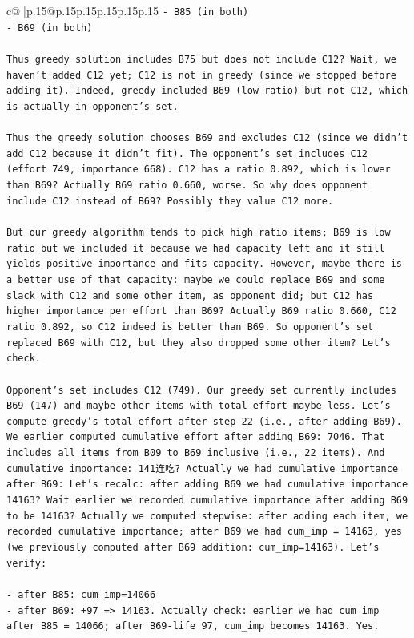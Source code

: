 \documentclass{article}
\begin{document}
{\begin{supertabular}{c@{$\;$}|p{.15\linewidth}@{}p{.15\linewidth}p{.15\linewidth}p{.15\linewidth}p{.15\linewidth}p{.15\linewidth}}
{{{\texttt{{-} B85 (in both)} \\
\texttt{{-} B69 (in both)} \\
\\ 
\texttt{Thus greedy solution includes B75 but does not include C12? Wait, we haven't added C12 yet; C12 is not in greedy (since we stopped before adding it). Indeed, greedy included B69 (low ratio) but not C12, which is actually in opponent's set.} \\
\\ 
\texttt{Thus the greedy solution chooses B69 and excludes C12 (since we didn't add C12 because it didn't fit). The opponent's set includes C12 (effort 749, importance 668). C12 has a ratio 0.892, which is lower than B69? Actually B69 ratio 0.660, worse. So why does opponent include C12 instead of B69? Possibly they value C12 more.} \\
\\ 
\texttt{But our greedy algorithm tends to pick high ratio items; B69 is low ratio but we included it because we had capacity left and it still yields positive importance and fits capacity. However, maybe there is a better use of that capacity: maybe we could replace B69 and some slack with C12 and some other item, as opponent did; but C12 has higher importance per effort than B69? Actually B69 ratio 0.660, C12 ratio 0.892, so C12 indeed is better than B69. So opponent's set replaced B69 with C12, but they also dropped some other item? Let's check.} \\
\\ 
\texttt{Opponent's set includes C12 (749). Our greedy set currently includes B69 (147) and maybe other items with total effort maybe less. Let's compute greedy's total effort after step 22 (i.e., after adding B69). We earlier computed cumulative effort after adding B69: 7046. That includes all items from B09 to B69 inclusive (i.e., 22 items). And cumulative importance: 141连吃? Actually we had cumulative importance after B69: Let's recalc: after adding B69 we had cumulative importance 14163? Wait earlier we recorded cumulative importance after adding B69 to be 14163? Actually we computed stepwise: after adding each item, we recorded cumulative importance; after B69 we had cum\_imp = 14163, yes (we previously computed after B69 addition: cum\_imp=14163). Let's verify:} \\
\\ 
\texttt{{-} after B85: cum\_imp=14066} \\
\texttt{{-} after B69: +97 => 14163. Actually check: earlier we had cum\_imp after B85 = 14066; after B69{-}life 97, cum\_imp becomes 14163. Yes.} \\
}}}
\end{supertabular}}
\end{document}
